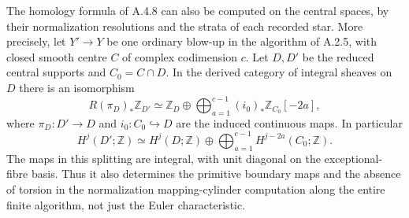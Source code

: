 \begin{proposition}\label{push:src:A.4.9}\label{push:A49}
The homology formula of A.4.8 can also be computed
on the central spaces, by their normalization
resolutions and the strata of each recorded star.
More precisely, let $Y'\to Y$ be one ordinary
blow-up in the algorithm of A.2.5, with closed
smooth centre $C$ of complex codimension $c$.
Let $D,D'$ be the reduced central supports and
$C_0=C\cap D$. In the derived category of integral
sheaves on $D$ there is an isomorphism
\[
 R(\pi_D)_*\mathbb Z_{D'}\simeq
 \mathbb Z_D\oplus
 \bigoplus_{a=1}^{c-1}(i_0)_*\mathbb Z_{C_0}[-2a],
 \tag{A.49a}
\]
where $\pi_D:D'\to D$ and $i_0:C_0\hookrightarrow D$
are the induced continuous maps. In particular
\[
 H^j(D';\mathbb Z)\simeq H^j(D;\mathbb Z)
 \oplus\bigoplus_{a=1}^{c-1}H^{j-2a}(C_0;\mathbb Z).
 \tag{A.49b}
\]
The maps in this splitting are integral, with unit
diagonal on the exceptional-fibre basis. Thus it
also determines the primitive boundary maps and
the absence of torsion in the normalization
mapping-cylinder computation along the entire
finite algorithm, not just the Euler characteristic.
\end{proposition}

